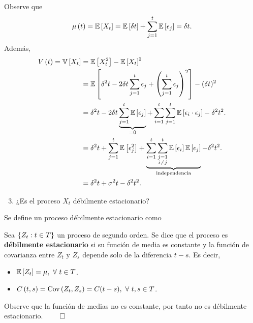 \documentclass[../main.tex]{subfiles}
\begin{document}
    \begin{demostracion}
    	Observe que
    	\begin{align*}
    		\mu\left( t \right) = \mathbb{E} \left[ X_t \right] = \mathbb{E} \left[ \delta t \right] + \sum_{j = 1}^{t} \mathbb{E} \left[ \epsilon_j \right] = \delta t.
    	\end{align*}
    	Además,
    	\begin{align*}
    		V\left( t \right) = \mathbb{V} \left[ X_t \right] &= \mathbb{E} \left[ X_t^2 \right] - \mathbb{E} \left[ X_t \right]^2\\
    		&= \mathbb{E} \left[ \delta^2 t - 2 \delta t \sum_{j = 1}^{t} \epsilon_j + \left( \sum_{j = 1}^{t} \epsilon_j \right)^2 \right] - (\delta t)^2\\
    		&= \delta^2 t - 2\delta t \underbrace{\sum_{j = 1}^{t} \mathbb{E} \left[ \epsilon_j \right]}_{= 0} + \sum_{i = 1}^{t} \sum_{j = 1}^{t} \mathbb{E} \left[ \epsilon_i \cdot \epsilon_j \right] - \delta^2 t^2.\\
    		&= \delta^2 t + \sum_{j = 1}^{t} \mathbb{E} \left[ \epsilon_j^2 \right] + \underbrace{\sum_{i = 1}^{t} \sum_{\substack{j=1\\i \neq j}}^t \mathbb{E} \left[ \epsilon_i \right]\mathbb{E} \left[ \epsilon_j \right]}_{\text{independencia}} - \delta^2 t^2.\\
    		&= \delta^2 t + \sigma^2 t - \delta^2 t^2.
    	\end{align*}
    \end{demostracion}
    \vspace{1em}
    \begin{enunciado}
    	\begin{enumerate}
            \setcounter{enumi}{2}
    		\item ¿Es el proceso $X_t$ débilmente estacionario?
    	\end{enumerate}
    \end{enunciado}
    \begin{demostracion}
        Se define un proceso débilmente estacionario como
    	\begin{definicion}
            Sea $\left\lbrace Z_t : t \in T \right\rbrace$ un proceso de segundo orden. Se dice que el proceso es \textbf{débilmente estacionario} si su función de media es constante y la función de covarianza entre $Z_t$ y $Z_s$ depende solo de la diferencia $t-s$. Es decir,
                \begin{itemize}
                    \item $\mathbb{E} \left[ Z_t \right] = \mu,\ \forall\  t \in T$.
                    \item $\f C {t,s} = \Cov{Z_t,Z_s} = C(t-s),\ \paratodo t,s \in T$.
                \end{itemize}
    	\end{definicion}
        Observe que la función de medias no es constante, por tanto no es débilmente estacionario. $\qed$
    \end{demostracion}
\end{document}
